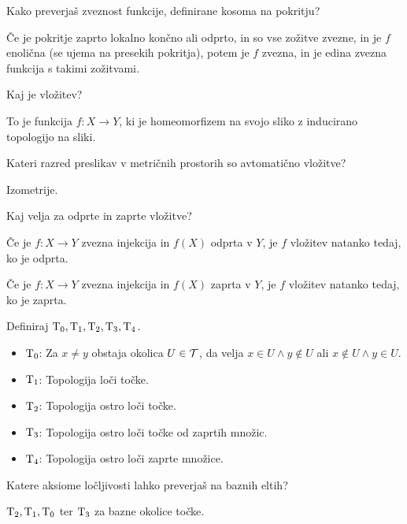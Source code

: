 \begin{vo}{Kako preverjaš zveznost funkcije, definirane kosoma na pokritju?}

Če je pokritje zaprto lokalno končno ali odprto, in so vse zožitve zvezne,
in je $f$ enolična (se ujema na presekih pokritja), potem je $f$ zvezna,
in je edina zvezna funkcija s takimi zožitvami.

\end{vo}

\begin{vo}{Kaj je vložitev?}

To je funkcija $f: X \to Y$, ki je homeomorfizem na svojo sliko z inducirano
topologijo na sliki.

\end{vo}

\begin{vo}{Kateri razred preslikav v metričnih prostorih so
avtomatično vložitve?}

Izometrije.

\end{vo}

\begin{vo}{Kaj velja za odprte in zaprte vložitve?}

Če je $f: X \to Y$ zvezna injekcija in $f(X)$ odprta v $Y$, je $f$ vložitev
natanko tedaj, ko je odprta.

Če je $f: X \to Y$ zvezna injekcija in $f(X)$ zaprta v $Y$, je $f$ vložitev
natanko tedaj, ko je zaprta.

\end{vo}

\begin{vo}{Definiraj $\text{T}_{0}, \text{T}_{1}, \text{T}_{2}, \text{T}_{3}, \text{T}_{4}$.}

\begin{itemize}
  \item $\text{T}_{0}$: Za $x \ne y$ obstaja okolica $U \in \mathcal{T}$, da velja
  $x \in U \land y \notin U$ ali $x \notin U \land y \in U$.
  \item $\text{T}_{1}$: Topologija loči točke.
  \item $\text{T}_{2}$: Topologija ostro loči točke.
  \item $\text{T}_{3}$: Topologija ostro loči točke od zaprtih množic.
  \item $\text{T}_{4}$: Topologija ostro loči zaprte množice.
\end{itemize}

\end{vo}

\begin{vo}{Katere aksiome ločljivosti lahko preverjaš na baznih eltih?}

$\text{T}_{2}, \text{T}_{1}, \text{T}_{0}$ ter $\text{T}_{3}$ za bazne okolice točke.

\end{vo}

